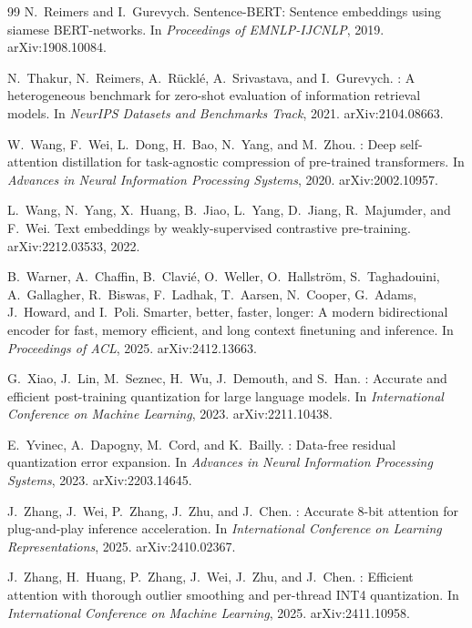 \documentclass[10pt]{article}
\begin{document}
\begin{thebibliography}{99}
N.~Reimers and I.~Gurevych.
\newblock Sentence-{BERT}: Sentence embeddings using siamese {BERT}-networks.
\newblock In \emph{Proceedings of EMNLP-IJCNLP}, 2019.
\newblock arXiv:1908.10084.

N.~Thakur, N.~Reimers, A.~R{\"u}ckl{\'e}, A.~Srivastava, and I.~Gurevych.
: A heterogeneous benchmark for zero-shot evaluation of
  information retrieval models.
\newblock In \emph{NeurIPS Datasets and Benchmarks Track}, 2021.
\newblock arXiv:2104.08663.

W.~Wang, F.~Wei, L.~Dong, H.~Bao, N.~Yang, and M.~Zhou.
: Deep self-attention distillation for task-agnostic
  compression of pre-trained transformers.
\newblock In \emph{Advances in Neural Information Processing Systems}, 2020.
\newblock arXiv:2002.10957.

L.~Wang, N.~Yang, X.~Huang, B.~Jiao, L.~Yang, D.~Jiang, R.~Majumder, and F.~Wei.
\newblock Text embeddings by weakly-supervised contrastive pre-training.
\newblock arXiv:2212.03533, 2022.

B.~Warner, A.~Chaffin, B.~Clavi{\'e}, O.~Weller, O.~Hallstr{\"o}m,
  S.~Taghadouini, A.~Gallagher, R.~Biswas, F.~Ladhak, T.~Aarsen, N.~Cooper,
  G.~Adams, J.~Howard, and I.~Poli.
\newblock Smarter, better, faster, longer: A modern bidirectional encoder for
  fast, memory efficient, and long context finetuning and inference.
\newblock In \emph{Proceedings of ACL}, 2025.
\newblock arXiv:2412.13663.

G.~Xiao, J.~Lin, M.~Seznec, H.~Wu, J.~Demouth, and S.~Han.
: Accurate and efficient post-training quantization for
  large language models.
\newblock In \emph{International Conference on Machine Learning}, 2023.
\newblock arXiv:2211.10438.

E.~Yvinec, A.~Dapogny, M.~Cord, and K.~Bailly.
: Data-free residual quantization error expansion.
\newblock In \emph{Advances in Neural Information Processing Systems}, 2023.
\newblock arXiv:2203.14645.

J.~Zhang, J.~Wei, P.~Zhang, J.~Zhu, and J.~Chen.
: Accurate 8-bit attention for plug-and-play inference
  acceleration.
\newblock In \emph{International Conference on Learning Representations}, 2025.
\newblock arXiv:2410.02367.

J.~Zhang, H.~Huang, P.~Zhang, J.~Wei, J.~Zhu, and J.~Chen.
: Efficient attention with thorough outlier smoothing
  and per-thread {INT4} quantization.
\newblock In \emph{International Conference on Machine Learning}, 2025.
\newblock arXiv:2411.10958.

\end{thebibliography}
\end{document}
